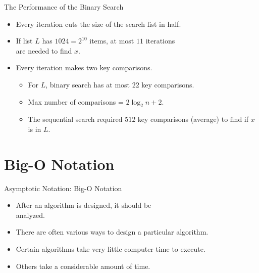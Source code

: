 \documentclass[14pt,aspectratio=1610]{beamer}
\begin{document}
\begin{frame}{The Performance of the Binary Search}
\begin{itemize}[<+->]
  \item
    Every iteration cuts the size of the search list in half.
  \item
    If list \(L\) has \(1024 = 2^{10}\) items, at most \(11\) iterations\\ are needed to find \(x\).
  \item
    Every iteration makes two key comparisons.
    \begin{itemize}
      \item
        For \(L\), binary search has at most \(22\) key comparisons.
      \item
        Max number of comparisons = \(2\log_2n+2\).
      \item
        The sequential search required \(512\) key comparisons (average) to find if \(x\) is in \(L\).
    \end{itemize}
\end{itemize}
\end{frame}

\section{Big-O Notation}

\begin{frame}{Asymptotic Notation: Big-O Notation}
\begin{itemize}[<+->]\setlength\itemsep{0.5em}
  \item
    After an algorithm is designed, it should be\\ analyzed.
  \item
    There are often various ways to design a particular algorithm.
  \item
    Certain algorithms take very little computer time to execute.
  \item
    Others take a considerable amount of time.
\end{itemize}
\end{frame}
\end{document}
